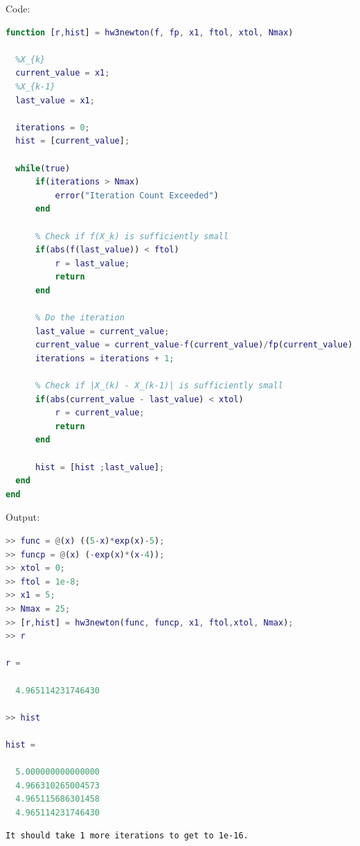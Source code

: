 \documentclass[12pt]{article}
\theoremstyle{homework}
\begin{document}
\begin{verbatim}

\end{verbatim}
Code:
\begin{lstlisting}[language=Matlab]
function [r,hist] = hw3newton(f, fp, x1, ftol, xtol, Nmax)
    
  %X_{k}
  current_value = x1;
  %X_{k-1}
  last_value = x1;
  
  iterations = 0;
  hist = [current_value];
  
  while(true)
      if(iterations > Nmax)
          error("Iteration Count Exceeded")
      end
      
      % Check if f(X_k) is sufficiently small
      if(abs(f(last_value)) < ftol)
          r = last_value;
          return
      end
      
      % Do the iteration
      last_value = current_value;
      current_value = current_value-f(current_value)/fp(current_value);
      iterations = iterations + 1;
      
      % Check if |X_(k) - X_(k-1)| is sufficiently small
      if(abs(current_value - last_value) < xtol)
          r = current_value;
          return
      end

      hist = [hist ;last_value];
  end
end
\end{lstlisting}
Output:
\begin{lstlisting}[language=Matlab]
>> func = @(x) ((5-x)*exp(x)-5);
>> funcp = @(x) (-exp(x)*(x-4));
>> xtol = 0;
>> ftol = 1e-8;
>> x1 = 5;
>> Nmax = 25;
>> [r,hist] = hw3newton(func, funcp, x1, ftol,xtol, Nmax);
>> r

r =

  4.965114231746430

>> hist

hist =

  5.000000000000000
  4.966310265004573
  4.965115686301458
  4.965114231746430
\end{lstlisting}
\begin{verbatim}
It should take 1 more iterations to get to 1e-16.
\end{verbatim}
\end{document}
